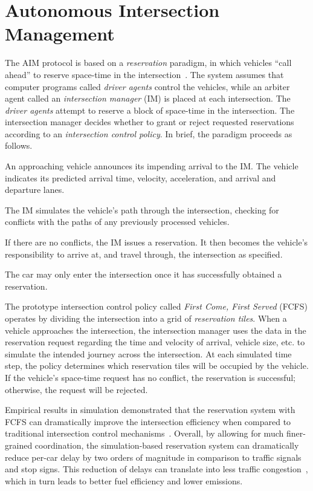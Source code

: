 \section{Autonomous Intersection Management}
\label{sec:aim}

The AIM protocol is based on a \emph{reservation} paradigm, in which
vehicles ``call ahead'' to reserve space-time in the
intersection~\cite{bib:Dresner08Multiagent}. The system assumes that
computer programs called \emph{driver agents} control the vehicles,
while an arbiter agent called an \emph{intersection manager} (IM) is
placed at each intersection.  The \emph{driver agents} attempt to reserve a
block of space-time in the intersection.  The intersection manager
decides whether to grant or reject requested reservations according to
an \emph{intersection control policy}.  In brief, the paradigm
proceeds as follows.
\begin{small_ind_s_itemize}
\item An approaching vehicle announces its impending arrival to the
IM.  The vehicle indicates its predicted arrival time, velocity,
acceleration, and arrival and departure lanes.
\item The IM simulates the vehicle's path through
the intersection, checking for conflicts with the paths of any
previously processed vehicles.
\item If there are no conflicts, the IM issues a
reservation. It then becomes the vehicle's responsibility to arrive at, and
travel through, the intersection as specified.
\item The car may only enter the intersection once it has successfully
obtained a reservation.
\end{small_ind_s_itemize}
The prototype intersection control policy called \emph{First Come,
First Served} (FCFS) operates by dividing the intersection into a grid
of \emph{reservation tiles}. When a vehicle approaches the
intersection, the intersection manager uses the data in the
reservation request regarding the time and velocity of arrival,
vehicle size, etc. to simulate the intended journey across the
intersection.  At each simulated time step, the policy determines
which reservation tiles will be occupied by the vehicle.  If the
vehicle's space-time request has no conflict, the reservation is
successful; otherwise, the request will be rejected.

Empirical results in simulation demonstrated that the 
reservation system with FCFS can dramatically improve the intersection
efficiency when compared to traditional intersection control
mechanisms~\cite{bib:Dresner08Multiagent}.  Overall, by
allowing for much finer-grained coordination, the simulation-based
reservation system can dramatically reduce per-car delay by two orders
of magnitude in comparison to traffic signals and stop signs.  This
reduction of delays can translate into less traffic
congestion~\cite{bib:Au10Motion,bib:Quinlan10Bringing}, which in turn
leads to better fuel efficiency and lower emissions.

